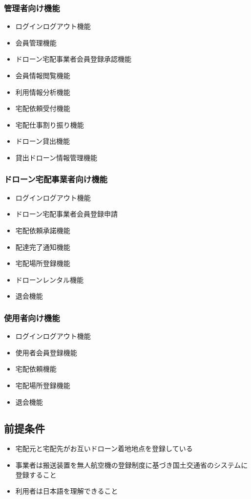 \documentclass[a4paper, titlepage]{jsarticle}
\begin{document}
\subsubsection{管理者向け機能}
\begin{itemize}
    \item ログインログアウト機能
    \item 会員管理機能
    \item ドローン宅配事業者会員登録承認機能
    \item 会員情報閲覧機能
    \item 利用情報分析機能
    \item 宅配依頼受付機能
    \item 宅配仕事割り振り機能
    \item ドローン貸出機能
    \item 貸出ドローン情報管理機能
\end{itemize}
\subsubsection{ドローン宅配事業者向け機能}
\begin{itemize}
    \item ログインログアウト機能
    \item ドローン宅配事業者会員登録申請
    \item 宅配依頼承諾機能
    \item 配達完了通知機能
    \item 宅配場所登録機能
    \item ドローンレンタル機能
    \item 退会機能
\end{itemize}
\subsubsection{使用者向け機能}
\begin{itemize}
    \item ログインログアウト機能
    \item 使用者会員登録機能
    \item 宅配依頼機能
    \item 宅配場所登録機能
    \item 退会機能
\end{itemize}
\subsection{前提条件}
\begin{itemize}
	\item 宅配元と宅配先がお互いドローン着地地点を登録している
	\item 事業者は搬送装置を無人航空機の登録制度に基づき国土交通省のシステムに登録すること
	\item 利用者は日本語を理解できること
\end{itemize}
\end{document}
